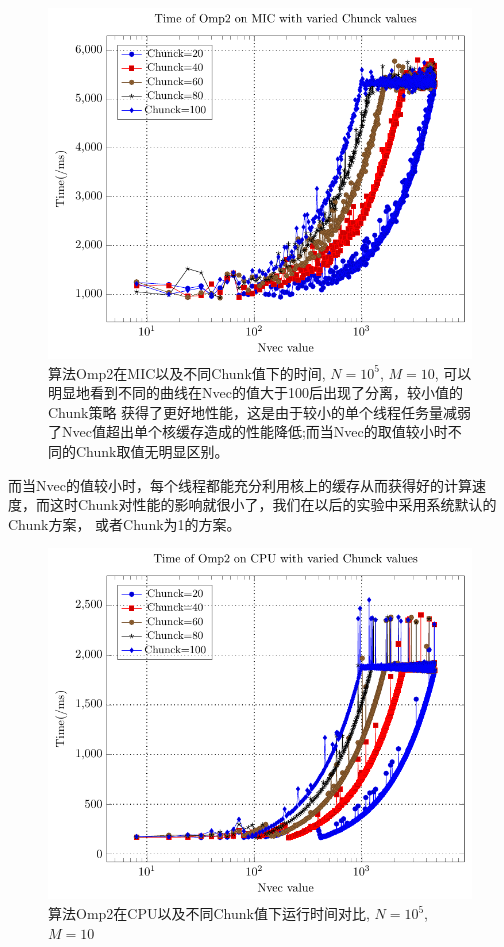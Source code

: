 \begin{figure}[!t]
   \centering
   \includegraphics[width=\textwidth]{chap5/Figures/bsV2-mic-Time-Chunck.pdf}
   \caption{算法Omp2在MIC以及不同Chunk值下的时间, $N=10^5$, $M=10$, 可以明显地看到不同的曲线在Nvec的值大于100后出现了分离，较小值的Chunk策略
   获得了更好地性能，这是由于较小的单个线程任务量减弱了Nvec值超出单个核缓存造成的性能降低;而当Nvec的取值较小时不同的Chunk取值无明显区别。}
   \label{fig:v2-mic-chunck-Nvec}
\end{figure}
而当Nvec的值较小时，每个线程都能充分利用核上的缓存从而获得好的计算速度，而这时Chunk对性能的影响就很小了，我们在以后的实验中采用系统默认的Chunk方案，
或者Chunk为1的方案。
\begin{figure}[!t]
   \centering
   \includegraphics[width=\textwidth]{chap5/Figures/bsV2-CPU-Time-Chunck.pdf}
   \caption{算法Omp2在CPU以及不同Chunk值下运行时间对比, $N=10^5$, $M=10$}
   \label{fig:v2-cpu-chunck-Nvec}
\end{figure}

